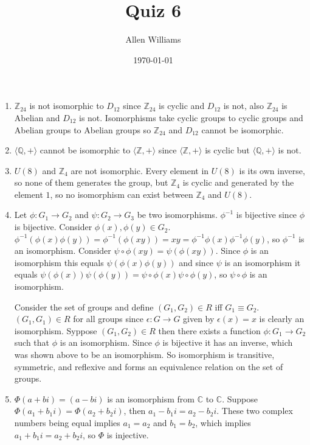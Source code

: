 \documentclass{amsart}
\title{Quiz 6}
\author{Allen Williams }
\date{\today}
\begin{document}
\maketitle

\begin{enumerate}
    \item $\mathbb{Z}_{24}$ is not isomorphic to $D_{12}$ since $\mathbb{Z}_{24}$ is cyclic and $D_{12}$ is not, also $\mathbb{Z}_{24}$ is Abelian and $D_{12}$ is not.  Isomorphisms take cyclic groups to cyclic groups and Abelian groups to Abelian groups so $\mathbb{Z}_{24}$ and $D_{12}$ cannot be isomorphic.
    \item $\langle \mathbb{Q},+\rangle$ cannot be isomorphic to $\langle \mathbb{Z},+\rangle$ since $\langle \mathbb{Z},+\rangle$ is cyclic but $\langle \mathbb{Q},+\rangle$ is not.
    \item $U(8)$ and $\mathbb{Z}_4$ are not isomorphic.  Every element in $U(8)$ is its own inverse, so none of them generates the group, but $\mathbb{Z}_4$ is cyclic and generated by the element $1$, so no isomorphism can exist between $\mathbb{Z}_4$ and $U(8)$.
    \item Let $\phi:G_1\to G_2$ and $\psi:G_2\to G_3$ be two isomorphisms.  $\phi^{-1}$ is bijective since $\phi$ is bijective.  Consider $\phi(x),\phi(y)\in G_2$.  $\phi^{-1}(\phi(x)\phi(y))=\phi^{-1}(\phi(xy))=xy=\phi^{-1}\phi(x)\phi^{-1}\phi(y)$, so $\phi^{-1}$ is an isomorphism.  Consider $\psi\circ\phi(xy)=\psi(\phi(xy)).$  Since $\phi$ is an isomorphism this equals $\psi(\phi(x)\phi(y))$ and since $\psi$ is an isomorphism it equals $\psi(\phi(x))\psi(\phi(y))=\psi\circ\phi(x)\psi\circ\phi(y)$, so $\psi\circ\phi$ is an isomorphism.
    
    Consider the set of groups and define $(G_1, G_2)\in R$ iff $G_1\equiv G_2$.  $(G_1, G_1)\in R$ for all groups since $\epsilon:G\to G$ given by $\epsilon(x)=x$ is clearly an isomorphism.  Syppose $(G_1, G_2)\in R$ then there exists a function $\phi:G_1\to G_2$ such that $\phi$ is an isomorphism.  Since $\phi$ is bijective it has an inverse, which was shown above to be an isomorphism.  So isomorphism is transitive, symmetric, and reflexive and forms an equivalence relation on the set of groups.
    \item $\Phi(a+bi)=(a-bi)$ is an isomorphism from $\mathbb{C}$ to $\mathbb{C}$.  Suppose $\Phi(a_1+b_1i)=\Phi(a_2+b_2i)$, then $a_1-b_1i=a_2-b_2i$.  These two complex numbers being equal implies $a_1=a_2$ and $b_1=b_2$, which implies $a_1+b_1i=a_2+b_2i$, so $\Phi$ is injective.
    

\end{enumerate}
\end{document}
